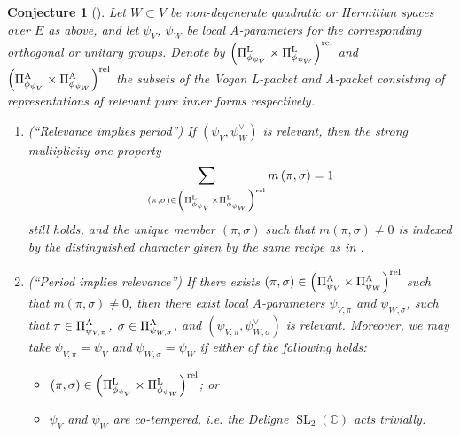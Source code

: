 \documentclass[11pt,letterpaper]{amsart}
\theoremstyle{plain}
\newcounter{theorem}[section]
\numberwithin{theorem}{section}
\numberwithin{equation}{subsection}
\newtheorem{Conj}[theorem]{Conjecture}
\theoremstyle{remark}
\newcommand{\SL}{\operatorname{SL}}
\newcommand{\C}{\mathbb{C}}
\def\LP{\Pi^{\rm L}} %
\def\AP{\Pi^{\rm A}} %
\def\rel{{\rm rel}} %
\begin{document}
\begin{Conj}[{\cite[Conj. 6.1 \& 7.1]{MR4190046}}]\label{Conj:Non-temperedGGP-intro}
Let $W \subset V$ be non-degenerate quadratic or Hermitian spaces over $E$ as above, and let $\psi_V$, $\psi_W$ be local A-parameters for the corresponding orthogonal or unitary groups. Denote by $\left(\LP_{\phi_{\psi_V}} \times \LP_{\phi_{\psi_W}}\right)^\rel$ and $\left(\AP_{\phi_{\psi_V}} \times \AP_{\phi_{\psi_W}}\right)^\rel$ the subsets of the Vogan L-packet and A-packet consisting of representations of relevant pure inner forms respectively.
\begin{enumerate}
       \item (``Relevance implies period'') If $\left(\psi_V,\psi_W^\vee\right)$ is relevant, then the strong multiplicity one property
\[
    \sum_{\left(\pi,\sigma\right)\in \left(\LP_{\phi_{\psi_V}}\times \LP_{\phi_{\psi_W}}\right)^\rel} m\left(\pi,\sigma\right)=1
\]
        still holds, and the unique member $\left(\pi,\sigma\right)$ such that $m\left(\pi,\sigma\right)\neq 0$ is indexed by the distinguished character given by the same recipe as in \cite[Sect. 6]{MR3202556}.

        \vskip 5pt

        \item (``Period implies relevance'') If there exists $\left(\pi,\sigma\right)\in\left(\AP_{\psi_V}\times \AP_{\psi_W}\right)^\rel$ such that $m\left(\pi,\sigma\right)\neq 0$, then there exist local A-parameters $\psi_{V,\pi}$ and $\psi_{W,\sigma}$, such that $\pi\in\AP_{\psi_{V,\pi}}$, $\sigma\in\AP_{\psi_{W,\sigma}}$, and $\left(\psi_{V,\pi},\psi_{W,\sigma}^\vee\right)$ is relevant. Moreover, we may take $\psi_{V,\pi}=\psi_V$ and $\psi_{W,\sigma}=\psi_W$ if either of the following holds:
        \begin{itemize}
            \item[a.] $\left(\pi,\sigma\right)\in\left(\LP_{\phi_{\psi_V}}\times \LP_{\phi_{\psi_W}}\right)^\rel$; or

            \vskip 5pt

            \item[b.] $\psi_V$ and $\psi_W$ are co-tempered, i.e. the Deligne $\SL_2\left(\C\right)$ acts trivially.
        \end{itemize}
\end{enumerate}
\end{Conj}

\vskip 5pt
\end{document}
